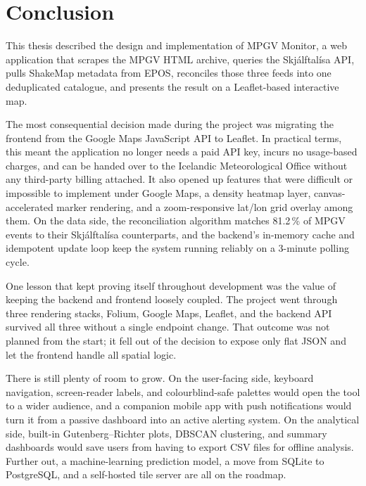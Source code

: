 \documentclass[12pt]{article}
\begin{document}
\section{Conclusion}
This thesis described the design and implementation of MPGV Monitor, a web application that scrapes the MPGV HTML archive, queries the Skjálftalísa API, pulls ShakeMap metadata from EPOS, reconciles those three feeds into one deduplicated catalogue, and presents the result on a Leaflet-based interactive map.

The most consequential decision made during the project was migrating the frontend from the Google Maps JavaScript API to Leaflet. In practical terms, this meant the application no longer needs a paid API key, incurs no usage-based charges, and can be handed over to the Icelandic Meteorological Office without any third-party billing attached. It also opened up features that were difficult or impossible to implement under Google Maps, a density heatmap layer, canvas-accelerated marker rendering, and a zoom-responsive lat/lon grid overlay among them. On the data side, the reconciliation algorithm matches 81.2\,\% of MPGV events to their Skjálftalísa counterparts, and the backend's in-memory cache and idempotent update loop keep the system running reliably on a 3-minute polling cycle.

One lesson that kept proving itself throughout development was the value of keeping the backend and frontend loosely coupled. The project went through three rendering stacks, Folium, Google Maps, Leaflet, and the backend API survived all three without a single endpoint change. That outcome was not planned from the start; it fell out of the decision to expose only flat JSON and let the frontend handle all spatial logic.

There is still plenty of room to grow. On the user-facing side, keyboard navigation, screen-reader labels, and colourblind-safe palettes would open the tool to a wider audience, and a companion mobile app with push notifications would turn it from a passive dashboard into an active alerting system. On the analytical side, built-in Gutenberg--Richter plots, DBSCAN clustering, and summary dashboards would save users from having to export CSV files for offline analysis. Further out, a machine-learning prediction model, a move from SQLite to PostgreSQL, and a self-hosted tile server are all on the roadmap.

\clearpage
\appendix
\end{document}
